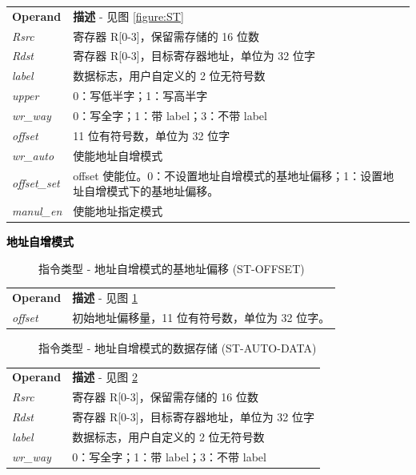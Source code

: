 \documentclass[main\_\_CN.tex]{subfiles}
\begin{document}
\begin{tabular}{ l l }
\textbf{Operand} & \textbf{描述} - 见图 \ref{figure:ST} \\
\textit{Rsrc} & 寄存器 R[0-3]，保留需存储的 16 位数 \\
\textit{Rdst} & 寄存器 R[0-3]，目标寄存器地址，单位为 32 位字\\
\textit{label} & 数据标志，用户自定义的 2 位无符号数\\
\textit{upper} & 0：写低半字；1：写高半字 \\
\textit{wr\_way} & 0：写全字；1：带 label；3：不带 label \\
\textit{offset} & 11 位有符号数，单位为 32 位字\\
\textit{wr\_auto} & 使能地址自增模式 \\
\textit{offset\_set} & offset 使能位。0：不设置地址自增模式的基地址偏移；1：设置地址自增模式下的基地址偏移。\\
\textit{manul\_en} & 使能地址指定模式
\end{tabular}

\textcolor{black}{\bfseries 地址自增模式}

%
%
%
%
%
\begin{figure}[!ht]
    \centering
    \caption{指令类型 - 地址自增模式的基地址偏移 (ST-OFFSET)}
    \label{figure:ST-AUTO-OFFSET}
\end{figure}

\begin{tabular}{ l l }
\textbf{Operand} & \textbf{描述} - 见图 \ref{figure:ST-AUTO-OFFSET} \\
\textit{offset} & 初始地址偏移量，11 位有符号数，单位为 32 位字。 \\
\end{tabular}

%
%
%
%
%
%
%
%
\begin{figure}[!ht]
    \centering
    \caption{指令类型 - 地址自增模式的数据存储 (ST-AUTO-DATA)}
    \label{figure:ST-AUTO-DATA}
\end{figure}

\begin{tabular}{ l l }
\textbf{Operand} & \textbf{描述} - 见图 \ref{figure:ST-AUTO-DATA} \\
\textit{Rsrc} & 寄存器 R[0-3]，保留需存储的 16 位数 \\
\textit{Rdst} & 寄存器 R[0-3]，目标寄存器地址，单位为 32 位字 \\
\textit{label} & 数据标志，用户自定义的 2 位无符号数 \\
\textit{wr\_way} & 0：写全字；1：带 label；3：不带 label \\
\end{tabular}
\end{document}
